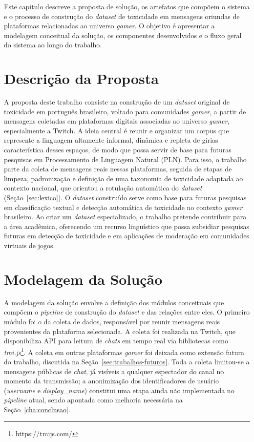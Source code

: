 \documentclass{eic-bcc-tcc}
\begin{document}
Este capítulo descreve a proposta de solução, os artefatos que compõem o sistema e o processo de construção do \textit{dataset} de toxicidade em mensagens oriundas de plataformas relacionadas ao universo \textit{gamer}. O objetivo é apresentar a modelagem conceitual da solução, os componentes desenvolvidos e o fluxo geral do sistema ao longo do trabalho.

\section{Descrição da Proposta}

A proposta deste trabalho consiste na construção de um \textit{dataset} original de toxicidade em português brasileiro, voltado para comunidades \textit{gamer}, a partir de mensagens coletadas em plataformas digitais associadas ao universo \textit{gamer}, especialmente a Twitch. A ideia central é reunir e organizar um corpus que represente a linguagem altamente informal, dinâmica e repleta de gírias característica desses espaços, de modo que possa servir de base para futuras pesquisas em Processamento de Linguagem Natural (PLN). Para isso, o trabalho parte da coleta de mensagens reais nessas plataformas, seguida de etapas de limpeza, padronização e definição de uma taxonomia de toxicidade adaptada ao contexto nacional, que orientou a rotulação automática do \textit{dataset} (Seção~\ref{sec:lexico}). O \textit{dataset} construído serve como base para futuras pesquisas em classificação textual e detecção automática de toxicidade no contexto \textit{gamer} brasileiro.
Ao criar um \textit{dataset} especializado, o trabalho pretende contribuir para a área acadêmica, oferecendo um recurso linguístico que possa subsidiar pesquisas futuras em detecção de toxicidade e em aplicações de moderação em comunidades virtuais de jogos.

\section{Modelagem da Solução}

A modelagem da solução envolve a definição dos módulos conceituais que compõem o \textit{pipeline} de construção do \textit{dataset} e das relações entre eles. O primeiro módulo foi o da coleta de dados, responsável por reunir mensagens reais provenientes da plataforma selecionada. A coleta foi realizada na Twitch, que disponibiliza API para leitura de \textit{chats} em tempo real via bibliotecas como \textit{tmi.js}\footnote{https://tmijs.com/}. A coleta em outras plataformas \textit{gamer} foi deixada como extensão futura do trabalho, discutida na Seção~\ref{sec:trabalhos-futuros}. Toda a coleta limitou-se a mensagens públicas de \textit{chat}, já visíveis a qualquer espectador do canal no momento da transmissão; a anonimização dos identificadores de usuário (\textit{username} e \textit{display\_name}) constitui uma etapa ainda não implementada no \textit{pipeline} atual, sendo apontada como melhoria necessária na Seção~\ref{cha:conclusao}.
\end{document}

